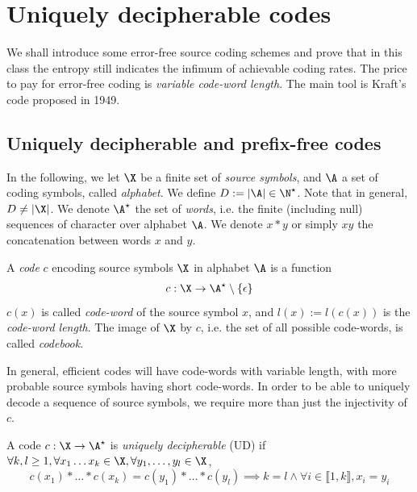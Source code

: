 \documentclass[toc, titlepaged]{../cs-classes/cs-classes}
\begin{document}
\section{Uniquely decipherable codes}
We shall introduce some error-free source coding schemes and prove
that in this class the entropy still indicates the infimum of achievable coding rates. The price to pay for error-free coding is \emph{variable code-word length}. The main tool is Kraft's code proposed in 1949.

\subsection{Uniquely decipherable and prefix-free codes}
In the following, we let $\X$ be a finite set of \emph{source symbols}, and $\A$ a set of coding symbols, called \emph{alphabet}. We define $D:=|\A|\in\N^\star$. Note that in general, $D\neq|\X|$. We denote $\A^\star$ the set of \emph{words}, i.e. the finite (including null) sequences of character over alphabet $\A$. We denote $x*y$ or simply $xy$ the concatenation between words $x$ and $y$.

\begin{definition}[Code]
    A \emph{code} $c$ encoding source symbols $\X$ in alphabet $\A$ is a function
    \begin{equation*}
            c: \X\to \A^\star\setminus\{\epsilon\}
    \end{equation*}
    $c(x)$ is called \emph{code-word} of the source symbol $x$, and $l(x):=l(c(x))$ is the \emph{code-word length}. The image of $\X$ by $c$, i.e. the set of all possible code-words, is called \emph{codebook}.
\end{definition}
In general, efficient codes will have code-words with variable length, with more probable source symbols having short code-words. In order to be able to uniquely decode a sequence of source symbols, we require more than just the injectivity of $c$.

\begin{definition}
    A code $c: \X\to\A^\star$ is \emph{uniquely decipherable} (UD) if $\forall k, l \geq 1, \forall x_1\dots x_k\in \X, \forall y_1, \dots, y_l\in \X$,
    \begin{equation}
        \boxed{c(x_1)*\dots*c(x_k)=c(y_1)*\dots*c(y_l) \implies k=l \land \forall i\in\llbracket 1, k\rrbracket, x_i=y_i}
    \end{equation}
\end{definition}
\end{document}
